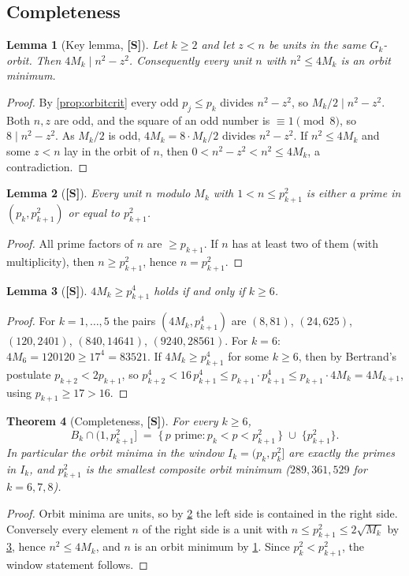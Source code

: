 \documentclass[11pt,a4paper]{article}
\newcommand{\statS}{\textsf{\textbf{[S]}}}
\theoremstyle{plain}
\newtheorem{theorem}{Theorem}[section]
\newtheorem{lemma}[theorem]{Lemma}
\theoremstyle{definition}
\theoremstyle{remark}
\begin{document}
\subsection{Completeness}
\begin{lemma}[Key lemma, \statS]\label{lem:key}
Let $k\ge2$ and let $z<n$ be units in the same $G_k$-orbit. Then
$4M_k\mid n^2-z^2$. Consequently every unit $n$ with $n^2\le4M_k$ is an
orbit minimum.
\end{lemma}
\begin{proof}
By \cref{prop:orbitcrit} every odd $p_j\le p_k$ divides $n^2-z^2$, so
$M_k/2\mid n^2-z^2$. Both $n,z$ are odd, and the square of an odd number is
$\equiv1\pmod8$, so $8\mid n^2-z^2$. As $M_k/2$ is odd, $4M_k=8\cdot M_k/2$
divides $n^2-z^2$. If $n^2\le4M_k$ and some $z<n$ lay in the orbit of $n$, then
$0<n^2-z^2<n^2\le4M_k$, a contradiction.
\end{proof}

\begin{lemma}[\statS]\label{lem:units}
Every unit $n$ modulo $M_k$ with $1<n\le p_{k+1}^2$ is either a prime in
$(p_k,p_{k+1}^2)$ or equal to $p_{k+1}^2$.
\end{lemma}
\begin{proof}
All prime factors of $n$ are $\ge p_{k+1}$. If $n$ has at least two of them
(with multiplicity), then $n\ge p_{k+1}^2$, hence $n=p_{k+1}^2$.
\end{proof}

\begin{lemma}[\statS]\label{lem:threshold}
$4M_k\ge p_{k+1}^4$ holds if and only if $k\ge6$.
\end{lemma}
\begin{proof}
For $k=1,\dots,5$ the pairs $(4M_k,p_{k+1}^4)$ are $(8,81)$, $(24,625)$,
$(120,2401)$, $(840,14641)$, $(9240,28561)$. For $k=6$:
$4M_6=120120\ge17^4=83521$. If $4M_k\ge p_{k+1}^4$ for some $k\ge6$, then by
Bertrand's postulate $p_{k+2}<2p_{k+1}$, so
$p_{k+2}^4<16\,p_{k+1}^4\le p_{k+1}\cdot p_{k+1}^4\le p_{k+1}\cdot4M_k=4M_{k+1}$,
using $p_{k+1}\ge17>16$.
\end{proof}

\begin{theorem}[Completeness, \statS]\label{thm:completeness}
For every $k\ge6$,
\[
B_k\cap(1,p_{k+1}^2]\;=\;\{\,p\text{ prime}: p_k<p<p_{k+1}^2\,\}\;\cup\;\{p_{k+1}^2\}.
\]
In particular the orbit minima in the window $I_k=(p_k,p_k^2]$ are exactly the
primes in $I_k$, and $p_{k+1}^2$ is the smallest composite orbit minimum
($289,361,529$ for $k=6,7,8$).
\end{theorem}
\begin{proof}
Orbit minima are units, so by \cref{lem:units} the left side is contained in
the right side. Conversely every element $n$ of the right side is a unit with
$n\le p_{k+1}^2\le2\sqrt{M_k}$ by \cref{lem:threshold}, hence $n^2\le4M_k$, and
$n$ is an orbit minimum by \cref{lem:key}. Since $p_k^2<p_{k+1}^2$, the window
statement follows.
\end{proof}
\end{document}
